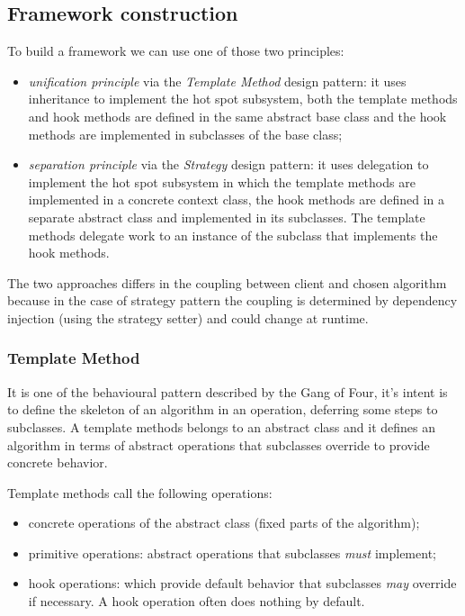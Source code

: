 \subsection{Framework construction}
To build a framework we can use one of those two principles:
\begin{itemize}
    \item \emph{unification principle} via the \emph{Template Method} design pattern: it uses inheritance to implement the hot spot subsystem, both the template methods and hook methods are defined in the same abstract base class and the hook methods are implemented in subclasses of the base class;

    \item \emph{separation principle} via the \emph{Strategy} design pattern: it uses delegation to implement the hot spot subsystem in which the template methods are implemented in a concrete context class, the hook methods are defined in a separate abstract class and implemented in its subclasses.
    The template methods delegate work to an instance of the subclass that implements the hook methods.
\end{itemize}
The two approaches differs in the coupling between client and chosen algorithm because in the case of strategy pattern the coupling is determined by dependency injection (using the strategy setter) and could change at runtime.


\subsubsection{Template Method}
It is one of the behavioural pattern described by the Gang of Four, it's intent is to define the skeleton of an algorithm in an operation, deferring some steps to subclasses.
A template methods belongs to an abstract class and it defines an algorithm in terms of abstract operations that subclasses override to provide concrete behavior.

Template methods call the following operations:
\begin{itemize}
    \item concrete operations of the abstract class (fixed parts of the algorithm);
    \item primitive operations: abstract operations that subclasses \emph{must} implement;
    \item hook operations: which provide default behavior that subclasses \emph{may} override if necessary.
    A hook operation often does nothing by default.
\end{itemize}

